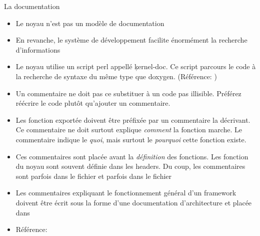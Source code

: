 \begin{frame}[fragile=singleslide]{La documentation}
  \begin{itemize}
  \item Le noyau n'est pas un modèle de documentation
  \item En  revanche, le système de  développement facilite énormément
    la recherche d'informations
  \item  Le noyau utilise  un script  perl appellé  \c{kernel-doc}. Ce
    script parcours le code à la recherche de syntaxe du même type que
    doxygen.  (Référence: )
  \item  Un  commentaire ne  doit  pas ce  substituer  à  un code  pas
    illisible.  Préférez   réécrire  le  code   plutôt  qu'ajouter  un
    commentaire.
  \item Les fonction exportée doivent être préfixée par un commentaire
    la   décrivant.    Ce  commentaire   ne   doit  surtout   explique
    \emph{comment}  la  fonction marche.   Le  commentaire indique  le
    \emph{quoi},  mais  surtout   le  \emph{pourquoi}  cette  fonction
    existe.
  \item Ces  commentaires sont  placée avant la  \emph{définition} des
    fonctions.  Les  fonction du noyau  sont souvent définie  dans les
    headers.  Du  coup, les commentaires sont parfois  dans le fichier
     et parfois dans le fichier 
  \item  Les commentaires  expliquant le  fonctionnement  général d'un
    framework  doivent être  écrit sous  la forme  d'une documentation
    d'architecture et placée dans 
  \item Référence: 
  \end{itemize}
\end{frame} 

